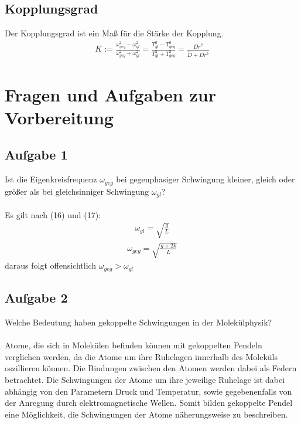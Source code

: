 \documentclass[a4paper,10pt]{scrartcl}
\begin{document}
		\subsection{Kopplungsgrad}
			Der Kopplungsgrad ist ein Maß für die Stärke der Kopplung.
			\begin{align}
			K:=\frac{\omega_{geg}^{2}-\omega_{gl}^{2}}{\omega_{geg}^{2}+\omega_{gl}^{2}}=\frac{T_{gl}^{2}-T_{geg}^{2}}{T_{gl}^{2}+T_{geg}^{2}}=\frac{Dr^{2}}{\tilde{D}+Dr^{2}}
			\end{align}
			
	\section{Fragen und Aufgaben zur Vorbereitung}
		\subsection{Aufgabe 1}
			Ist die Eigenkreisfrequenz \(\omega_{geg}\) bei gegenphasiger Schwingung kleiner, gleich oder größer als
			bei gleichsinniger Schwingung \(\omega_{gl}\)?\\
			\\
			Es gilt nach (16) und (17):
			\begin{align*}
			\omega_{gl}=\sqrt{\frac{g}{L}}
			\end{align*}
			\begin{align}
			\omega_{geg}=\sqrt{\frac{g+2k}{L}}
			\end{align}	
			daraus folgt offensichtlich \(\omega_{geg}>\omega_{gl}\)
			
		\subsection{Aufgabe 2}
			Welche Bedeutung haben gekoppelte Schwingungen in der Molekülphysik?\\
			\\
			Atome, die sich in Molekülen befinden können mit gekoppelten Pendeln verglichen werden, da die Atome um ihre Ruhelagen innerhalb des Moleküls oszillieren können. Die Bindungen zwischen den Atomen werden dabei als Federn betrachtet. Die Schwingungen der Atome um ihre jeweilige Ruhelage ist dabei abhängig von den Parametern Druck und Temperatur, sowie gegebenenfalls von der Anregung durch elektromagnetische Wellen. Somit bilden gekoppelte Pendel eine Möglichkeit, die Schwingungen der Atome näherungsweise zu beschreiben.
			
\end{document}

